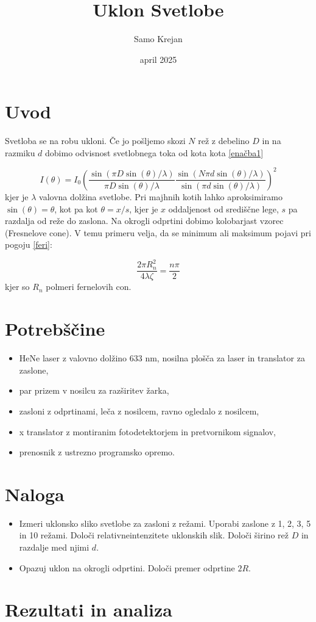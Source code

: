 \documentclass[12pt]{article}
\title{\textbf{Uklon Svetlobe}}
\author{Samo Krejan}
\date{april 2025}
\begin{document}
\maketitle

\section{Uvod}

Svetloba se na robu ukloni. Če jo pošljemo skozi $N$ rež z debelino $D$ in na razmiku $d$ dobimo odvisnost svetlobnega toka od kota kota \ref{enačba1}

\begin{equation}
    I(\theta) = I_0 \left( \frac{\sin(\pi D \sin(\theta)/\lambda)}{\pi D \sin(\theta)/\lambda}\frac{\sin(N\pi d \sin(\theta)/\lambda)}{\sin(\pi d \sin(\theta)/\lambda)} \right)^2
    \label{enačba1}
\end{equation}
kjer je $\lambda$ valovna dolžina svetlobe. Pri majhnih kotih lahko aproksimiramo $\sin(\theta) = \theta$, kot pa kot $\theta = x/s$, kjer je $x$ oddaljenost od središčne lege, $s$ pa razdalja od reže do zaslona. Na okrogli odprtini dobimo kolobarjast vzorec (Fresnelove cone). V temu primeru velja, da se minimum ali maksimum pojavi pri pogoju \ref{feri}:

\begin{equation}
    \frac{2\pi R_n^2}{4\lambda\zeta}=\frac{n\pi}{2}
    \label{feri}
\end{equation}
kjer so $R_n$ polmeri fernelovih con.


\section{Potrebščine}
\begin{itemize}
    \item HeNe laser z valovno dolžino 633 nm, nosilna plošča za laser in translator za zaslone,
    \item par prizem v nosilcu za razširitev žarka,
    \item zasloni z odprtinami, leča z nosilcem, ravno ogledalo z nosilcem,
    \item x translator z montiranim fotodetektorjem in pretvornikom signalov,
    \item prenosnik z ustrezno programsko opremo.
\end{itemize}


\section{Naloga}

\begin{itemize}
    \item Izmeri uklonsko sliko svetlobe za zasloni z režami. Uporabi zaslone z 1, 2, 3, 5 in 10 režami. Določi relativneintenzitete uklonskih slik. Določi širino rež $D$ in razdalje med njimi $d$.
    \item Opazuj uklon na okrogli odprtini. Določi premer odprtine $2R$.
\end{itemize}
\newpage
\section{Rezultati in analiza}
\end{document}
